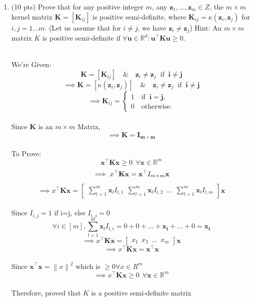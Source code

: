\documentclass[a4paper]{article}
\theoremstyle{definition}
\def\R{\mathbb R}
\newenvironment{soln}{
    \leavevmode\color{blue}\ignorespaces
}{}
\begin{document}
\begin{enumerate}
    \item (10 pts) Prove that for any positive integer $m$, any $\mathbf z_1, \ldots,\mathbf z_m \in Z$, the $m\times m$ kernel matrix $\mathbf K = [\mathbf K_{ij} ]$ is
positive semi-definite, where $\mathbf K_{ij} = \kappa(\mathbf z_i
, \mathbf z_j )$ for $i, j = 1 \ldots m$. (Let us assume that for $i \neq j$, we have
$\mathbf z_i \neq \mathbf z_j$) Hint: An  $m\times m$  matrix $K $ is positive semi-definite if  $\forall \mathbf u\in \R^d: \mathbf u^\top \mathbf K\mathbf u\geq 0$.
\begin{soln}
    \\We're Given: 
    \[ \mathbf K = [ \mathbf K_{ij} ] \quad \& \quad  \mathbf z_i \neq \mathbf z_j \;\;\mathrm{ if }\;\; \mathbf i \neq \mathbf j \]
    \[ \implies \mathbf K = [ \kappa(\mathbf z_i,\mathbf z_j)  ] \quad \& \quad  \mathbf z_i \neq \mathbf z_j \;\;\mathrm{ if }\;\; \mathbf i \neq \mathbf j \]
    \[ \implies \mathbf K_{ij}=\begin{cases}
                1 \quad \mathrm{if }\;\; \mathbf i=\mathbf j,\\
                0\quad \mathrm{otherwise}.\end{cases} 
    \]
    \\ Since $\mathbf K$ is an $m \times m$ Matrix,
    \[ \implies \mathbf K = \mathbf{I_{m \times m}} \]
    \\ To Prove:
    \[ \mathbf x^\top \mathbf K\mathbf x\geq 0 \:\: \forall \mathbf x\in \R^m \]
    \[ \implies x^\top \mathbf K\mathbf x = \mathbf x^\top \mathbf \mathbf{I_{m \times m}}\mathbf x \]
    \[ \implies x^\top \mathbf K\mathbf x = \begin{bmatrix} \sum_{l=1}^{m} \mathbf x_l I_{l, 1} \:\: \sum_{l=1}^{m} \mathbf x_l I_{l, 2} \:\: \dots \:\: \sum_{l=1}^{m} \mathbf x_l I_{l, m} \end{bmatrix} \mathbf x \]
    \\ Since $I_{i, j} = 1$ if i=j, else $I_{i, j} = 0$
    \[ \forall i \in [m], \sum_{l=1}^{m}\mathbf{x}_l I_{l, i} =  0 + 0 + \dots + \mathbf{x_i} + \dots + 0 = \mathbf{x_i} \]
    \[ \implies x^\top \mathbf K\mathbf x = \begin{bmatrix} x_1 \:\: x_2 \:\: \dots \:\: x_m \end{bmatrix} \mathbf x \]
    \[ \implies x^\top \mathbf K\mathbf x = \mathbf x^\top \mathbf x \]
    \\Since $\mathbf x^\top \mathbf x = \left \| x \right \|^{2} $ which is $ \geq 0 \forall x \in R^m $
    \[ \implies x^\top \mathbf K\mathbf x \geq 0\:\: \forall \mathbf x\in \R^m \]
    \\ Therefore, proved that $K$ is a positive semi-definite matrix


\end{soln}
\end{enumerate}
\end{document}

